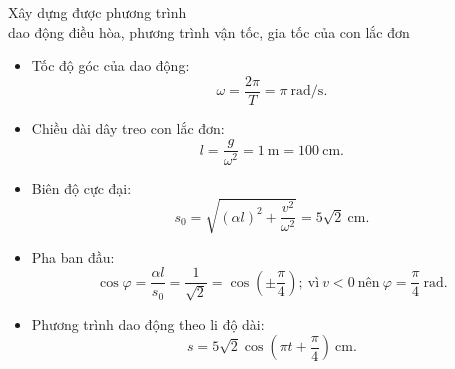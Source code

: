 \begin{dang}{Xây dựng được phương trình\\ dao động điều hòa, phương trình vận tốc, gia tốc của con lắc đơn}
{		\begin{itemize}
			\item Tốc độ góc của dao động:
			\begin{equation*}
				\omega =\dfrac{2\pi}{T} = \pi\ \text{rad/s}.
			\end{equation*}
			\item Chiều dài dây treo con lắc đơn:
			\begin{equation*}
				l= \dfrac{g}{\omega^2} = 1\ \text{m} = 100\ \text{cm}.
			\end{equation*}
			\item Biên độ cực đại:
			\begin{equation*}
				s_0 =\sqrt {(\alpha l)^2 + \dfrac{v^2}{\omega^2}} = 5\sqrt 2\ \text{cm}.
			\end{equation*}
			\item Pha ban đầu:
			\begin{equation*}
				\cos \varphi  = \dfrac{\alpha l}{s_0} =\dfrac{1}{\sqrt 2} = \cos \left(\pm \dfrac{\pi}{4}\right);\ \text{vì}\ v<0\ \text{nên}\ \varphi = \dfrac{\pi}{4}\ \text{rad}.
			\end{equation*}
			\item Phương trình dao động theo li độ dài:
			\begin{equation*}
				s=5\sqrt 2 \cos \left(\pi t + \dfrac{\pi}{4}\right)\ \text{cm}.
			\end{equation*}
		\end{itemize}
	}
	
\end{dang}
